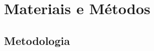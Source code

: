 \chapter{Materiais e Métodos}
\label{chap:mat}
\lipsum[1]

\section{Metodologia}
\label{sec:met}
\lipsum[1]



